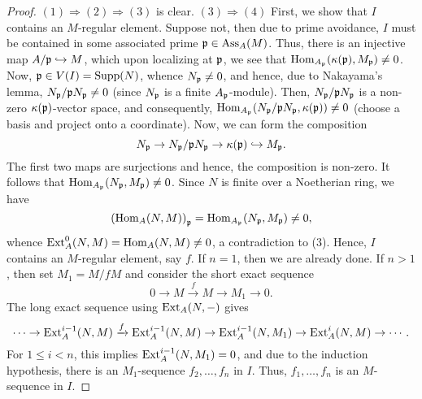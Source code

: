 \begin{proof}
    $(1)\Rightarrow(2)\Rightarrow(3)$ is clear. $(3)\Rightarrow(4)$ First, we show that $I$ contains an $M$-regular element. Suppose not, then due to prime avoidance, $I$ must be contained in some associated prime $\mathfrak{p}\in\operatorname{Ass}_A(M)$. Thus, there is an injective map $A/\mathfrak{p}\hookrightarrow M$, which upon localizing at $\mathfrak{p}$, we see that $\operatorname{Hom}_{A_{\mathfrak{p}}}(\kappa(\mathfrak{p}), M_{\mathfrak{p}})\ne 0$. Now, $\mathfrak{p}\in V(I) = \operatorname{Supp}(N)$, whence $N_{\mathfrak{p}}\ne 0$, and hence, due to Nakayama's lemma, $N_{\mathfrak{p}}/\mathfrak{p} N_{\mathfrak{p}} \ne 0$ (since $N_{\mathfrak{p}}$ is a finite $A_{\mathfrak{p}}$-module). Then, $N_{\mathfrak{p}}/\mathfrak{p} N_{\mathfrak{p}}$ is a non-zero $\kappa(\mathfrak{p})$-vector space, and consequently, $\operatorname{Hom}_{A_{\mathfrak{p}}}(N_{\mathfrak{p}}/\mathfrak{p} N_{\mathfrak{p}}, \kappa(\mathfrak{p}))\ne 0$ (choose a basis and project onto a coordinate). Now, we can form the composition 
    \begin{equation*}
        N_{\mathfrak{p}}\to N_{\mathfrak{p}}/\mathfrak{p} N_{\mathfrak{p}}\to \kappa(\mathfrak{p})\hookrightarrow M_{\mathfrak{p}}.
    \end{equation*}
    The first two maps are surjections and hence, the composition is non-zero. It follows that $\operatorname{Hom}_{A_{\mathfrak{p}}}(N_{\mathfrak{p}}, M_{\mathfrak{p}})\ne 0$. Since $N$ is finite over a Noetherian ring, we have 
    \begin{equation*}
        \left(\operatorname{Hom}_A(N, M)\right)_{\mathfrak{p}} = \operatorname{Hom}_{A_{\mathfrak{p}}}(N_{\mathfrak{p}}, M_{\mathfrak{p}})\ne 0,
    \end{equation*}
    whence $\operatorname{Ext}^0_A(N, M) = \operatorname{Hom}_A(N, M)\ne 0$, a contradiction to (3). Hence, $I$ contains an $M$-regular element, say $f$. If $n = 1$, then we are already done. If $n > 1$, then set $M_1 = M/fM$ and consider the short exact sequence 
    \begin{equation*}
        0\to M\xrightarrow{f} M\to M_1\to 0.
    \end{equation*}
    The long exact sequence using $\operatorname{Ext}_A(N, -)$ gives 
    \begin{equation*}
        \cdots\to\operatorname{Ext}^{i - 1}_A(N, M)\xrightarrow{f}\operatorname{Ext}^{i - 1}_A(N, M)\to\operatorname{Ext}^{i - 1}_A(N, M_1)\to\operatorname{Ext}^{i}_A(N, M)\to\cdots.
    \end{equation*}
    For $1\le i < n$, this implies $\operatorname{Ext}^{i - 1}_A(N, M_1) = 0$, and due to the induction hypothesis, there is an $M_1$-sequence $f_2,\dots,f_n$ in $I$. Thus, $f_1,\dots,f_n$ is an $M$-sequence in $I$.


\end{proof}
